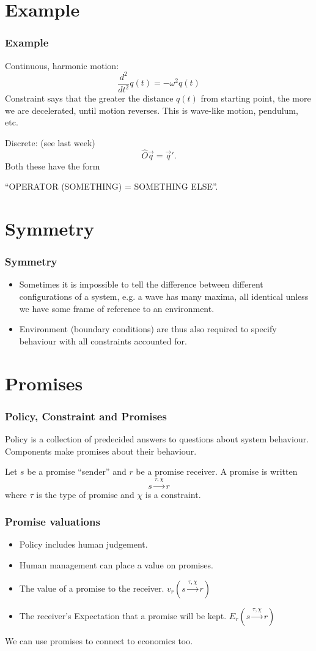 \documentclass[12pt]{beamer}
\begin{document}
\section{Example}

\frame
{
\frametitle{Example}
Continuous, harmonic motion:
$$
\frac{d^2}{dt^2} q(t)= -\omega^2 q(t)
$$
Constraint says that the greater the distance $q(t)$ from starting point, the more we are
decelerated, until motion reverses. This is wave-like motion, pendulum, etc.
}

\frame
{
Discrete: (see last week)
$$
\hat O \vec q = \vec q'.
$$
Both these have the form 
\vspace{1cm}

``OPERATOR (SOMETHING) = SOMETHING ELSE''.
}

\section{Symmetry}

\frame
{
\frametitle{Symmetry}
\begin{itemize}
\item Sometimes it is impossible to tell the difference between different configurations
of a system, e.g. a wave has many maxima, all identical unless we have some
frame of reference to an environment.

\item Environment (boundary conditions) are thus also required to specify behaviour with all
constraints accounted for.
\end{itemize}
}

\section{Promises}

\frame
{
\frametitle{Policy, Constraint and Promises}

Policy is a collection of predecided answers to questions about
system behaviour. Components make promises about their behaviour.

Let $s$ be a promise ``sender'' and $r$ be a promise receiver. A promise
is written
$$
s \stackrel{\tau,\chi}{\longrightarrow} r
$$
where $\tau$ is the type of promise and $\chi$ is a constraint.
}

\frame
{
\frametitle{Promise valuations}
\begin{itemize}
\item Policy includes human judgement.

\item Human management can place a value on promises.

\item The value of a promise to the receiver.
$v_r \left( s \stackrel{\tau,\chi}{\longrightarrow} r\right)$

\item The receiver's Expectation that a promise will be kept.
$E_r \left( s \stackrel{\tau,\chi}{\longrightarrow} r\right)$
\end{itemize}
We can use promises to connect to economics too.
}
\end{document}
